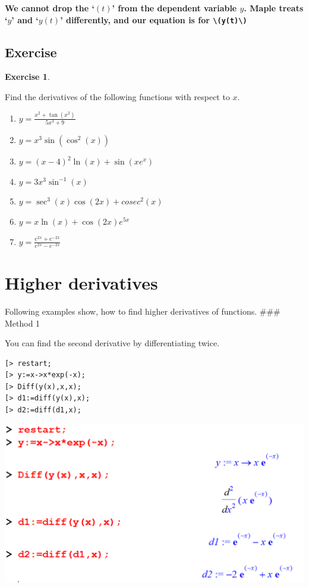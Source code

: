 \documentclass[
]{book}
\providecommand{\tightlist}{%
  \setlength{\itemsep}{0pt}\setlength{\parskip}{0pt}}
\theoremstyle{definition}
\theoremstyle{definition}
\theoremstyle{definition}
\newtheorem{exercise}{Exercise}[chapter]
\theoremstyle{definition}
\theoremstyle{remark}
\begin{document}
\textbf{We cannot drop the `\((t)\)' from the dependent variable \(y\). Maple treats `\(y\)' and `\(y(t)\)' differently, and our equation is for \texttt{\textbackslash{}(y(t)\textbackslash{})}}

\subsection{Exercise}\label{exercise-8}

\begin{exercise}
\protect\hypertarget{exr:unnamed-chunk-43}{}\label{exr:unnamed-chunk-43}

Find the derivatives of the following functions with respect to \(x\).

\begin{enumerate}
\def\labelenumi{\arabic{enumi}.}
\tightlist
\item
  \(y = \frac{x^2 + \tan(x^2)}{5x^3 + 9}\)
\item
  \(y = x^{3}\sin(\cos^2(x))\)
\item
  \(y = {(x - 4)^2}{\ln(x)} + \sin(xe^x)\)
\item
  \(y = {3x^3}{\sin^{-1}(x)}\)
\item
  \(y = {\sec^3(x)\cos(2x) + cosec^2(x)}\)
\item
  \(y = x\ln(x) + \cos(2x)e^{5x}\)
\item
  \(y = \frac{e^{2x} + e^{-2x}}{e^{2x} - e^{-2x}}\)
\end{enumerate}

\end{exercise}

\section{Higher derivatives}\label{higher-derivatives}

Following examples show, how to find higher derivatives of functions.
\#\#\# Method 1

You can find the second derivative by differentiating twice.

\begin{verbatim}
[> restart;
[> y:=x->x*exp(-x);
[> Diff(y(x),x,x);
[> d1:=diff(y(x),x);
[> d2:=diff(d1,x);
\end{verbatim}

\includegraphics{figures/Diff/Diff 6.2 -1.png}
\end{document}
